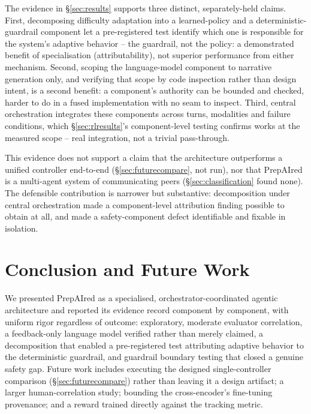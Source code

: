 \documentclass[conference]{IEEEtran}
\begin{document}
The evidence in \S\ref{sec:results} supports three distinct, separately-held claims. First, decomposing difficulty adaptation into a learned-policy and a deterministic-guardrail component let a pre-registered test identify which one is responsible for the system's adaptive behavior -- the guardrail, not the policy: a demonstrated benefit of specialisation (attributability), not superior performance from either mechanism. Second, scoping the language-model component to narrative generation only, and verifying that scope by code inspection rather than design intent, is a second benefit: a component's authority can be bounded and checked, harder to do in a fused implementation with no seam to inspect. Third, central orchestration integrates these components across turns, modalities and failure conditions, which \S\ref{sec:rlresults}'s component-level testing confirms works at the measured scope -- real integration, not a trivial pass-through.

This evidence does not support a claim that the architecture outperforms a unified controller end-to-end (\S\ref{sec:futurecompare}, not run), nor that PrepAIred is a multi-agent system of communicating peers (\S\ref{sec:classification} found none). The defensible contribution is narrower but substantive: decomposition under central orchestration made a component-level attribution finding possible to obtain at all, and made a safety-component defect identifiable and fixable in isolation.

\section{Conclusion and Future Work}

We presented PrepAIred as a specialised, orchestrator-coordinated agentic architecture and reported its evidence record component by component, with uniform rigor regardless of outcome: exploratory, moderate evaluator correlation, a feedback-only language model verified rather than merely claimed, a decomposition that enabled a pre-registered test attributing adaptive behavior to the deterministic guardrail, and guardrail boundary testing that closed a genuine safety gap. Future work includes executing the designed single-controller comparison (\S\ref{sec:futurecompare}) rather than leaving it a design artifact; a larger human-correlation study; bounding the cross-encoder's fine-tuning provenance; and a reward trained directly against the tracking metric.
\end{document}
